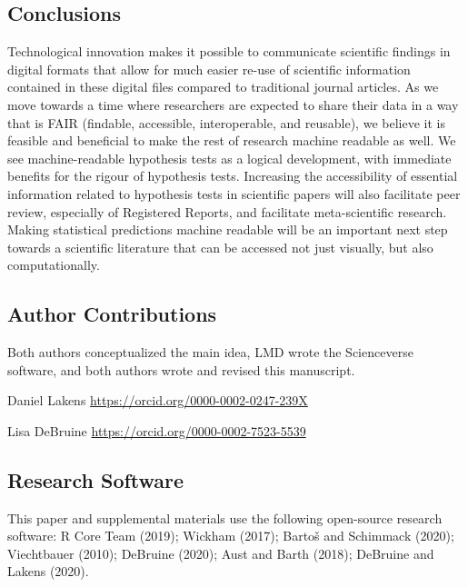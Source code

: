 \documentclass[
  english,
  doc,floatsintext]{apa6}
\begin{document}
\hypertarget{conclusions}{%
\subsection{Conclusions}\label{conclusions}}

Technological innovation makes it possible to communicate scientific findings in digital formats that allow for much easier re-use of scientific information contained in these digital files compared to traditional journal articles. As we move towards a time where researchers are expected to share their data in a way that is FAIR (findable, accessible, interoperable, and reusable), we believe it is feasible and beneficial to make the rest of research machine readable as well. We see machine-readable hypothesis tests as a logical development, with immediate benefits for the rigour of hypothesis tests. Increasing the accessibility of essential information related to hypothesis tests in scientific papers will also facilitate peer review, especially of Registered Reports, and facilitate meta-scientific research. Making statistical predictions machine readable will be an important next step towards a scientific literature that can be accessed not just visually, but also computationally.

\newpage

\hypertarget{author-contributions}{%
\subsection{Author Contributions}\label{author-contributions}}

Both authors conceptualized the main idea, LMD wrote the Scienceverse software, and both authors wrote and revised this manuscript.

Daniel Lakens \url{https://orcid.org/0000-0002-0247-239X}

Lisa DeBruine \url{https://orcid.org/0000-0002-7523-5539}

\hypertarget{research-software}{%
\subsection{Research Software}\label{research-software}}

This paper and supplemental materials use the following open-source research software: R Core Team (2019); Wickham (2017); Bartoš and Schimmack (2020); Viechtbauer (2010); DeBruine (2020); Aust and Barth (2018); DeBruine and Lakens (2020).
\end{document}
